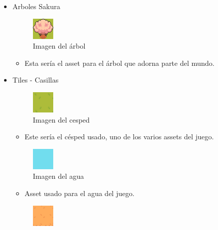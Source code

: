 \documentclass[a4paper]{article}
\begin{document}
\begin{appendices}
\begin{itemize}
\begin{itemize}
        \end{itemize}
        \item Arboles Sakura
        \begin{figure}[ht]
            \centering
            \includegraphics[width=0.1\textwidth]{Images/arboles.png}
            \caption{Imagen del árbol}
            \label{fig:player}
        \end{figure}
        \begin{itemize}
            \item Esta sería el asset para el árbol que adorna parte del mundo.
        \end{itemize}
        \clearpage
        \item Tiles - Casillas
        \begin{figure}[ht]
            \centering
            \includegraphics[width=0.1\textwidth]{Images/cesped1.png}
            \caption{Imagen del cesped}
            \label{fig:player}
        \end{figure}
        \begin{itemize}
            \item Este sería el césped usado, uno de los varios assets del juego.
        \end{itemize}
        \begin{figure}[ht]
            \centering
            \includegraphics[width=0.1\textwidth]{Images/agua.png}
            \caption{Imagen del agua}
            \label{fig:player}
        \end{figure}
        \begin{itemize}
            \item Asset usado para el agua del juego.
        \end{itemize}
        \begin{figure}[ht]
            \centering
            \includegraphics[width=0.1\textwidth]{Images/arena.png}

\end{figure}
\end{itemize}
\end{appendices}
\end{document}
